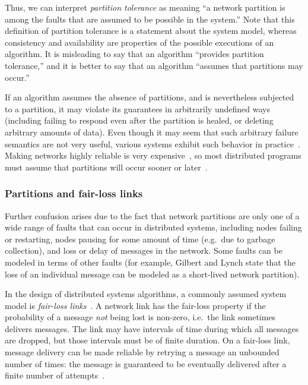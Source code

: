 \documentclass[a4paper,twocolumn,10pt]{article}
\begin{document}
Thus, we can interpret \emph{partition tolerance} as meaning ``a network partition is among the
faults that are assumed to be possible in the system.'' Note that this definition of partition
tolerance is a statement about the system model, whereas consistency and availability are properties
of the possible executions of an algorithm. It is misleading to say that an algorithm ``provides
partition tolerance,'' and it is better to say that an algorithm ``assumes that partitions may
occur.''

If an algorithm assumes the absence of partitions, and is nevertheless subjected to a partition, it
may violate its guarantees in arbitrarily undefined ways (including failing to respond even after
the partition is healed, or deleting arbitrary amounts of data). Even though it may seem that such
arbitrary failure semantics are not very useful, various systems exhibit such behavior in
practice~\cite{Kingsbury2014tk, Kingsbury2015uk}. Making networks highly reliable is very
expensive~\cite{Bailis2014jx}, so most distributed programs must assume that partitions will occur
sooner or later~\cite{Hale2010we}.

\subsubsection{Partitions and fair-loss links}\label{sec:fairloss}

Further confusion arises due to the fact that network partitions are only one of a wide range of
faults that can occur in distributed systems, including nodes failing or restarting, nodes pausing
for some amount of time (e.g.\ due to garbage collection), and loss or delay of messages in the
network. Some faults can be modeled in terms of other faults (for example, Gilbert and Lynch state
that the loss of an individual message can be modeled as a short-lived network partition).

In the design of distributed systems algorithms, a commonly assumed system model is \emph{fair-loss
links}~\cite{Cachin2011wt}. A network link has the fair-loss property if the probability of a
message \emph{not} being lost is non-zero, i.e.\ the link sometimes delivers messages. The link may
have intervals of time during which all messages are dropped, but those intervals must be of finite
duration. On a fair-loss link, message delivery can be made reliable by retrying a message an
unbounded number of times: the message is guaranteed to be eventually delivered after a finite
number of attempts~\cite{Cachin2011wt}.
\end{document}

